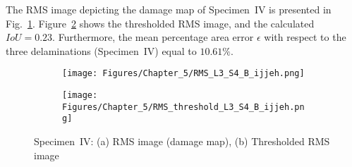 The RMS image depicting the damage map of Specimen~IV is presented in Fig.~\ref{fig:RMS_L3_S4_B_ijjeh}.
Figure~\ref{fig:RMS_threshold_L3_S4_B_ijjeh} shows the thresholded RMS image, and the calculated \(IoU=0.23\).
Furthermore, the mean percentage area error \(\epsilon\) with respect to the three delaminations (Specimen~IV) equal to \(10.61\%\).
\begin{figure} [!h]
	\begin{subfigure}[b]{.5\textwidth}
		\centering
		\texttt{[image: Figures/Chapter\_5/RMS\_L3\_S4\_B\_ijjeh.png]}
		\caption{} 
		\label{fig:RMS_L3_S4_B_ijjeh}
	\end{subfigure}
		\hfill
	\begin{subfigure}[b]{.42\textwidth}
		\centering
		\texttt{[image: Figures/Chapter\_5/RMS\_threshold\_L3\_S4\_B\_ijjeh.png]}
		\caption{} 
		\label{fig:RMS_threshold_L3_S4_B_ijjeh}
	\end{subfigure}
	\caption{Specimen~IV: (a) RMS image (damage map), (b) Thresholded RMS image}
	\label{fig:RMS_L3_S4_B__images}
\end{figure} 
\clearpage